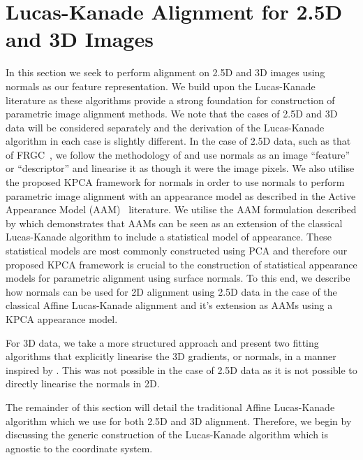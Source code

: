 \section{Lucas-Kanade Alignment for 2.5D and 3D Images}\label{sec:singl_imag_lk}
In this section we seek to perform alignment on 2.5D and 3D images using
normals as our feature representation. We build upon the
Lucas-Kanade~\cite{lucas1981iterative} literature as these algorithms provide
a strong foundation for construction of parametric image alignment methods. We note that
the cases of 2.5D and 3D data will be considered separately and the derivation
of the Lucas-Kanade algorithm in each case is slightly different. In the
case of 2.5D data, such as that of FRGC~\cite{phillips2005overview}, we follow
the methodology of \citet{antonakos2015feature} and use normals as an image
``feature'' or ``descriptor'' and linearise it as though it were the image pixels.
We also utilise the proposed KPCA framework for normals in order to use normals
to perform parametric image alignment with an appearance model as described
in the Active Appearance Model (AAM)~\cite{cootes2001active} literature. We
utilise the AAM formulation described by \citet{matthews2004active} which
demonstrates that AAMs can be seen as an extension of the classical Lucas-Kanade
algorithm to include a statistical model of appearance. These statistical models
are most commonly constructed using PCA and therefore our proposed KPCA
framework is crucial to the construction of statistical appearance models for
parametric alignment using surface normals. To this end, we describe how
normals can be used for 2D alignment using 2.5D data in the case of the
classical Affine Lucas-Kanade alignment and it's extension as AAMs using a
KPCA appearance model.

For 3D data, we take a more structured approach and present two fitting algorithms
that explicitly linearise the 3D gradients, or normals, in a manner inspired
by \citet{tzimiropoulos2011robust}. This was not possible in the case of 2.5D
data as it is not possible to directly linearise the normals in 2D.

The remainder of this section will detail the traditional Affine Lucas-Kanade
algorithm which we use for both 2.5D and 3D alignment. Therefore, we begin by
discussing the generic construction of the Lucas-Kanade algorithm which is
agnostic to the coordinate system.
